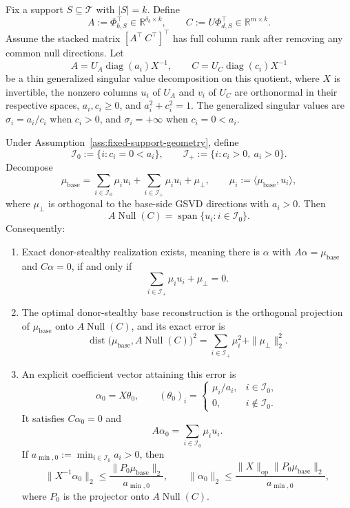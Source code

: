 \begin{assumption}
\label{ass:fixed-support-geometry}
Fix a support $S\subseteq\mathcal{T}$ with $|S|=k$. Define
\[
A:=\Phi_{b,S}^\top\in\mathbb{R}^{\delta_b\times k},
\qquad
C:=U\Phi_{d,S}^\top\in\mathbb{R}^{m\times k}.
\]
Assume the stacked matrix $[A^\top\ C^\top]^\top$ has full column rank after removing any common null directions. Let
\[
A=U_A\operatorname{diag}(a_i)X^{-1},
\qquad
C=U_C\operatorname{diag}(c_i)X^{-1}
\]
be a thin generalized singular value decomposition on this quotient, where $X$ is invertible, the nonzero columns $u_i$ of $U_A$ and $v_i$ of $U_C$ are orthonormal in their respective spaces, $a_i,c_i\ge 0$, and $a_i^2+c_i^2=1$. The generalized singular values are $\sigma_i=a_i/c_i$ when $c_i>0$, and $\sigma_i=+\infty$ when $c_i=0<a_i$.
\end{assumption}

\begin{theorem}
\label{thm:exact-asymmetric-realizability}
Under Assumption~\ref{ass:fixed-support-geometry}, define
\[
\mathcal{I}_0:=\{i:c_i=0<a_i\},
\qquad
\mathcal{I}_+:=\{i:c_i>0,\ a_i>0\}.
\]
Decompose
\[
\mu_{\text{base}}
=
\sum_{i\in\mathcal{I}_0}\mu_i u_i
+
\sum_{i\in\mathcal{I}_+}\mu_i u_i
+
\mu_\perp,
\qquad
\mu_i:=\langle \mu_{\text{base}},u_i\rangle,
\]
where $\mu_\perp$ is orthogonal to the base-side GSVD directions with $a_i>0$. Then
\[
A\operatorname{Null}(C)=\operatorname{span}\{u_i:i\in\mathcal{I}_0\}.
\]
Consequently:
\begin{enumerate}[leftmargin=*]
\item Exact donor-stealthy realization exists, meaning there is $\alpha$ with $A\alpha=\mu_{\text{base}}$ and $C\alpha=0$, if and only if
\[
\sum_{i\in\mathcal{I}_+}\mu_i u_i+\mu_\perp=0.
\]
\item The optimal donor-stealthy base reconstruction is the orthogonal projection of $\mu_{\text{base}}$ onto $A\operatorname{Null}(C)$, and its exact error is
\[
\operatorname{dist}\bigl(\mu_{\text{base}},A\operatorname{Null}(C)\bigr)^2
=
\sum_{i\in\mathcal{I}_+}\mu_i^2+\|\mu_\perp\|_2^2.
\]
\item An explicit coefficient vector attaining this error is
\[
\alpha_0=X\theta_0,
\qquad
(\theta_0)_i=
\begin{cases}
\mu_i/a_i, & i\in\mathcal{I}_0,\\
0, & i\notin\mathcal{I}_0.
\end{cases}
\]
It satisfies $C\alpha_0=0$ and
\[
A\alpha_0=\sum_{i\in\mathcal{I}_0}\mu_i u_i.
\]
If $a_{\min,0}:=\min_{i\in\mathcal{I}_0}a_i>0$, then
\[
\|X^{-1}\alpha_0\|_2
\le
\frac{\|P_0\mu_{\text{base}}\|_2}{a_{\min,0}},
\qquad
\|\alpha_0\|_2
\le
\frac{\|X\|_{\mathrm{op}}\|P_0\mu_{\text{base}}\|_2}{a_{\min,0}},
\]
where $P_0$ is the projector onto $A\operatorname{Null}(C)$.
\end{enumerate}
\end{theorem}


